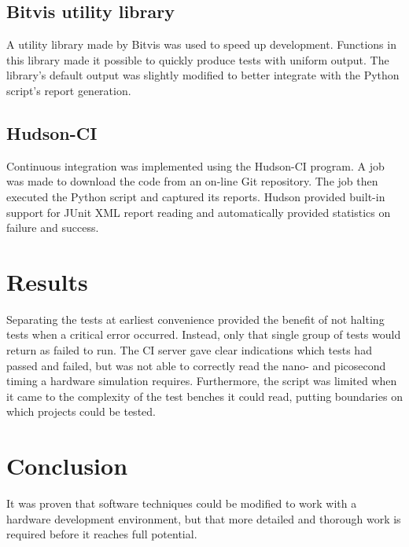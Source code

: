 \documentclass[twoside]{article}
\begin{document}
\begin{multicols}{2}
\subsection{Bitvis utility library}
A utility library made by Bitvis was used to speed up development. Functions in this library made it possible to quickly produce tests with uniform output. The library's default output was slightly modified to better integrate with the Python script's report generation.

\subsection{Hudson-CI}
Continuous integration was implemented using the Hudson-CI program. A job was made to download the code from an on-line Git repository. The job then executed the Python script and captured its reports. Hudson provided built-in support for JUnit XML report reading and automatically provided statistics on failure and success.

\section{Results}
Separating the tests at earliest convenience provided the benefit of not halting tests when a critical error occurred. Instead, only that single group of tests would return as failed to run. The CI server gave clear indications which tests had passed and failed, but was not able to correctly read the nano- and picosecond timing a hardware simulation requires. Furthermore, the script was limited when it came to the complexity of the test benches it could read, putting boundaries on which projects could be tested.

\section{Conclusion}
It was proven that software techniques could be modified to work with a hardware development environment, but that more detailed and thorough work is required before it reaches full potential. 

\renewcommand*{\bibfont}{\footnotesize}
\printbibliography


\end{multicols}
\end{document}
